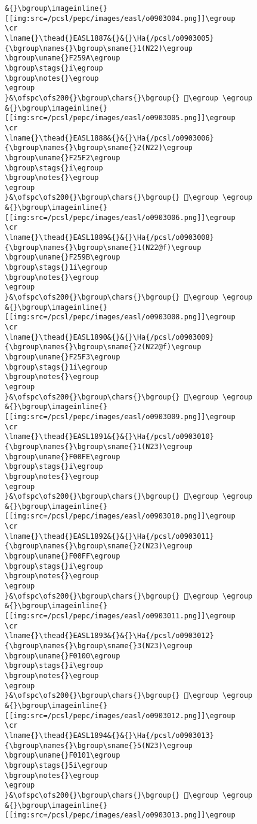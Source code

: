 \begin{verbatim}
&{}\bgroup\imageinline{}[[img:src=/pcsl/pepc/images/easl/o0903004.png]]\egroup
\cr
\lname{}\thead{}EASL1887&{}&{}\Ha{/pcsl/o0903005}{\bgroup\names{}\bgroup\sname{}1(N22)\egroup
\bgroup\uname{}F259A\egroup
\bgroup\stags{}i\egroup
\bgroup\notes{}\egroup
\egroup
}&\ofspc\ofs200{}\bgroup\chars{}\bgroup{} 󲖚\egroup \egroup
&{}\bgroup\imageinline{}[[img:src=/pcsl/pepc/images/easl/o0903005.png]]\egroup
\cr
\lname{}\thead{}EASL1888&{}&{}\Ha{/pcsl/o0903006}{\bgroup\names{}\bgroup\sname{}2(N22)\egroup
\bgroup\uname{}F25F2\egroup
\bgroup\stags{}i\egroup
\bgroup\notes{}\egroup
\egroup
}&\ofspc\ofs200{}\bgroup\chars{}\bgroup{} 󲗲\egroup \egroup
&{}\bgroup\imageinline{}[[img:src=/pcsl/pepc/images/easl/o0903006.png]]\egroup
\cr
\lname{}\thead{}EASL1889&{}&{}\Ha{/pcsl/o0903008}{\bgroup\names{}\bgroup\sname{}1(N22@f)\egroup
\bgroup\uname{}F259B\egroup
\bgroup\stags{}1i\egroup
\bgroup\notes{}\egroup
\egroup
}&\ofspc\ofs200{}\bgroup\chars{}\bgroup{} 󲖛\egroup \egroup
&{}\bgroup\imageinline{}[[img:src=/pcsl/pepc/images/easl/o0903008.png]]\egroup
\cr
\lname{}\thead{}EASL1890&{}&{}\Ha{/pcsl/o0903009}{\bgroup\names{}\bgroup\sname{}2(N22@f)\egroup
\bgroup\uname{}F25F3\egroup
\bgroup\stags{}1i\egroup
\bgroup\notes{}\egroup
\egroup
}&\ofspc\ofs200{}\bgroup\chars{}\bgroup{} 󲗳\egroup \egroup
&{}\bgroup\imageinline{}[[img:src=/pcsl/pepc/images/easl/o0903009.png]]\egroup
\cr
\lname{}\thead{}EASL1891&{}&{}\Ha{/pcsl/o0903010}{\bgroup\names{}\bgroup\sname{}1(N23)\egroup
\bgroup\uname{}F00FE\egroup
\bgroup\stags{}i\egroup
\bgroup\notes{}\egroup
\egroup
}&\ofspc\ofs200{}\bgroup\chars{}\bgroup{} 󰃾\egroup \egroup
&{}\bgroup\imageinline{}[[img:src=/pcsl/pepc/images/easl/o0903010.png]]\egroup
\cr
\lname{}\thead{}EASL1892&{}&{}\Ha{/pcsl/o0903011}{\bgroup\names{}\bgroup\sname{}2(N23)\egroup
\bgroup\uname{}F00FF\egroup
\bgroup\stags{}i\egroup
\bgroup\notes{}\egroup
\egroup
}&\ofspc\ofs200{}\bgroup\chars{}\bgroup{} 󰃿\egroup \egroup
&{}\bgroup\imageinline{}[[img:src=/pcsl/pepc/images/easl/o0903011.png]]\egroup
\cr
\lname{}\thead{}EASL1893&{}&{}\Ha{/pcsl/o0903012}{\bgroup\names{}\bgroup\sname{}3(N23)\egroup
\bgroup\uname{}F0100\egroup
\bgroup\stags{}i\egroup
\bgroup\notes{}\egroup
\egroup
}&\ofspc\ofs200{}\bgroup\chars{}\bgroup{} 󰄀\egroup \egroup
&{}\bgroup\imageinline{}[[img:src=/pcsl/pepc/images/easl/o0903012.png]]\egroup
\cr
\lname{}\thead{}EASL1894&{}&{}\Ha{/pcsl/o0903013}{\bgroup\names{}\bgroup\sname{}5(N23)\egroup
\bgroup\uname{}F0101\egroup
\bgroup\stags{}5i\egroup
\bgroup\notes{}\egroup
\egroup
}&\ofspc\ofs200{}\bgroup\chars{}\bgroup{} 󰄁\egroup \egroup
&{}\bgroup\imageinline{}[[img:src=/pcsl/pepc/images/easl/o0903013.png]]\egroup

\end{verbatim}
